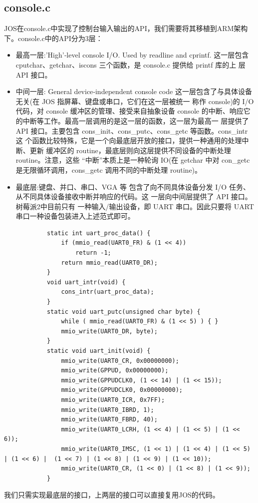 \documentclass[11pt,a4paper]{article}
\begin{document}
\begin{CJK}{UTF8}{gkai}
	\subsection{console.c}
	JOS在console.c中实现了控制台输入输出的API，我们需要将其移植到ARM架构下。console.c中的API分为3层：
	\begin{itemize}
		\item 最高一层:'High'‐level console I/O. Used by readline and cprintf.
		这一层包含 cputchar、getchar、iscons 三个函数，是 console.c 提供给 printf 库的上
		层 API 接口。
		\item 中间一层:  General device‐independent console code
		这一层包含了与具体设备无关(在 JOS 指屏幕、键盘或串口，它们在这一层被统一 称作 console)的 I/O 代码，对 console 缓冲区的管理、接受来自抽象设备 console 的中断、响应它的中断等工作。最高一层调用的是这一层的函数，这一层为最高一 层提供了 API 接口。主要包含 cons\_init、cons\_putc、cons\_getc 等函数。cons\_intr 这 个函数比较特殊，它是一个向最底层开放的接口，提供一种通用的处理中断、更新 缓冲区的 routine，最底层则向这层提供不同设备的中断处理 routine。注意，这些 “中断”本质上是一种轮询 IO(在 getchar 中对 con\_getc 是无限循环调用，cons\_getc 调用不同的中断处理 routine)。
		\item 最底层:键盘、并口、串口、VGA 等
		包含了向不同具体设备分发 I/O 任务、从不同具体设备接收中断并响应的代码。这 一层向中间层提供了 API 接口。树莓派2中目前只有 一种输入/输出设备，即 UART 串口。因此只要将 UART 串口一种设备包装进入上述范式即可。
	\end{itemize}
		\begin{lstlisting}
			static int uart_proc_data() {
				if (mmio_read(UART0_FR) & (1 << 4))
					return -1;
				return mmio_read(UART0_DR);
			}	
			void uart_intr(void) {	
				cons_intr(uart_proc_data);
			}	
			static void uart_putc(unsigned char byte) {
				while ( mmio_read(UART0_FR) & (1 << 5) ) { }
				mmio_write(UART0_DR, byte);
			}	
			static void uart_init(void) {
				mmio_write(UART0_CR, 0x00000000);
				mmio_write(GPPUD, 0x00000000);
				mmio_write(GPPUDCLK0, (1 << 14) | (1 << 15));
				mmio_write(GPPUDCLK0, 0x00000000);
				mmio_write(UART0_ICR, 0x7FF);
				mmio_write(UART0_IBRD, 1);
				mmio_write(UART0_FBRD, 40);
				mmio_write(UART0_LCRH, (1 << 4) | (1 << 5) | (1 << 6));
				mmio_write(UART0_IMSC, (1 << 1) | (1 << 4) | (1 << 5) | (1 << 6) |  (1 << 7) | (1 << 8) | (1 << 9) | (1 << 10));
				mmio_write(UART0_CR, (1 << 0) | (1 << 8) | (1 << 9));
			}
			\end{lstlisting}
			我们只需实现最底层的接口，上两层的接口可以直接复用JOS的代码。

\end{CJK}
\end{document}
